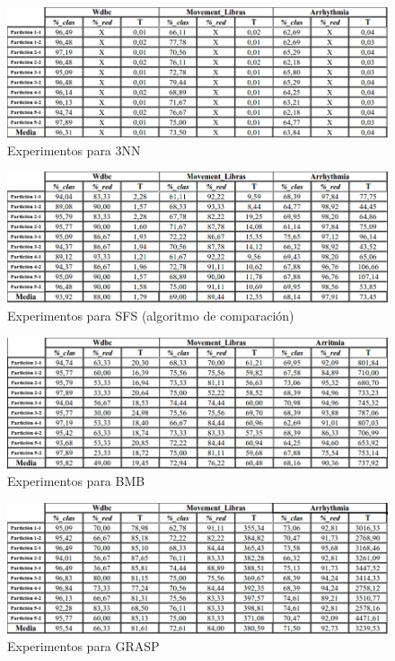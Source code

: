 \begin{figure} [H]
\centering
\includegraphics[width=1.0\linewidth]{3NN}
\caption{Experimentos para 3NN}
\label{fig:3NN}
\end{figure}

\begin{figure} [H]
\centering
\includegraphics[width=1.0\linewidth]{SFS}
\caption{Experimentos para SFS (algoritmo de comparación)}
\label{fig:SFS}
\end{figure}

\begin{figure} [H]
\centering
\includegraphics[width=1.0\linewidth]{BMB}
\caption{Experimentos para BMB}
\label{fig:BMB}
\end{figure}

\begin{figure} [H]
\centering
\includegraphics[width=1.0\linewidth]{GRASP}
\caption{Experimentos para GRASP}
\label{fig:GRASP}
\end{figure}

